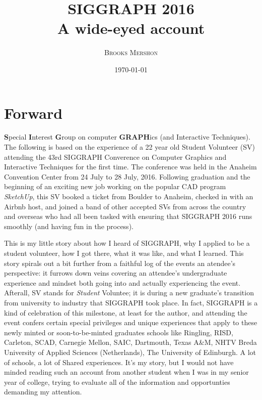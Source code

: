 \documentclass[a4paper, 11pt]{article} %
\title{\textbf{SIGGRAPH 2016}\\ %
A wide-eyed account} %
\author{\textsc{Brooks Mershon}} %
\date{\today} %
\begin{document}
\maketitle %

\eject


\renewcommand{\abstractname}{Forward} %

\section*{Forward}
	
\textbf{S}pecial \textbf{I}nterest \textbf{G}roup on computer \textbf{GRAPH}ics (and Interactive Techniques). The following is based on the experience of a 22 year old Student Volunteer (SV) attending the 43rd SIGGRAPH Converence on Computer Graphics and Interactive Techniques for the first time. The conference was held in the Anaheim Convention Center from 24 July to 28 July, 2016. Following graduation and the beginning of an exciting new job working on the popular CAD program \textit{SketchUp}, this SV booked a ticket from Boulder to Anaheim, checked in with an Airbnb host, and joined a band of other accepted SVs from across the country and overseas who had all been tasked with ensuring that SIGGRAPH 2016 runs smoothly (and having fun in the process).

This is my little story about how I heard of SIGGRAPH, why I applied to be a student volunteer, how I got there, what it was like, and what I learned. This story spirals out a bit further from a faithful log of the events an atendee's perspective: it furrows down veins covering an attendee's undergraduate experience and mindset both going into and actually experiencing the event. Afterall, SV stands for \textit{Student} Voluntee; it is during a new graduate's transition from university to industry that SIGGRAPH took place. In fact, SIGGRAPH is a kind of celebration of this milestone, at least for the author, and attending the event confers certain special privileges and unique experiences that apply to these newly minted or soon-to-be-minted graduates schools like Ringling, RISD, Carleton, SCAD, Carnegie Mellon, SAIC, Dartmouth, Texas A\&M, NHTV Breda University of Applied Sciences (Netherlands), The University of Edinburgh. A lot of schools, a lot of  Shared experiences. It's my story, but I would not have minded reading such an account from another student when I was in my senior year of college, trying to evaluate all of the information and opportunties demanding my attention.
\end{document}
